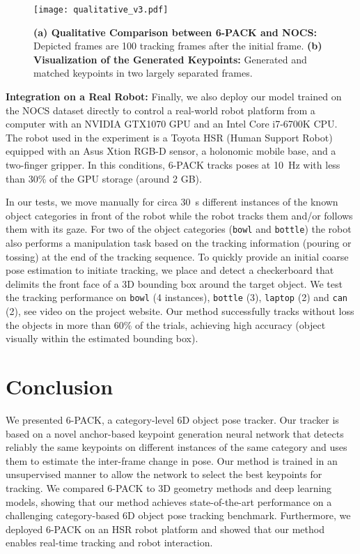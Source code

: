 \documentclass[letterpaper, 10 pt, conference]{ieeeconf}
\newcommand{\methodname}{\textsc{6-PACK}\xspace}
\begin{document}
\begin{figure}[tb]
\center
\texttt{[image: qualitative\_v3.pdf]}
\vspace{-3mm}
\caption{\textbf{(a) Qualitative Comparison between \methodname{} and NOCS:}  Depicted frames are 100 tracking frames after the initial frame. \textbf{(b) 
Visualization of the Generated Keypoints:} Generated and matched keypoints in two largely separated frames.}
\label{fig:qualitative}
\vspace{-4mm}
\end{figure}


\textbf{Integration on a Real Robot:}
Finally, we also deploy our model trained on the NOCS dataset directly to control a real-world robot platform from a computer with an NVIDIA GTX1070 GPU and an Intel Core i7-6700K CPU. The robot used in the experiment is a Toyota HSR (Human Support Robot) equipped with an Asus Xtion RGB-D sensor, a holonomic mobile base, and a two-finger gripper. In this conditions, \methodname{} tracks poses at \SI{10}{\hertz} with less than 30\% of the GPU storage (around 2 GB).


In our tests, we move manually for circa \SI{30}{\second} different instances of the known object categories in front of the robot while the robot tracks them and/or follows them with its gaze. For two of the object categories (\texttt{bowl} and \texttt{bottle}) the robot also performs a manipulation task based on the tracking information (pouring or tossing) at the end of the tracking sequence. To quickly provide an initial coarse pose estimation to initiate tracking, we place and detect a checkerboard that delimits the front face of a 3D bounding box around the target object. We test the tracking performance on \texttt{bowl} (4 instances), \texttt{bottle} (3), \texttt{laptop} (2) and \texttt{can} (2), see video on the project website. Our method successfully tracks without loss the objects in more than 60\% of the trials, achieving high accuracy (object visually within the estimated bounding box). 

\section{Conclusion}
We presented \methodname{}, a category-level 6D object pose tracker. Our tracker is based on a novel anchor-based keypoint generation neural network that detects reliably the same keypoints on different instances of the same category and uses them to estimate the inter-frame change in pose. Our method is trained in an unsupervised manner to allow the network to select the best keypoints for tracking. We compared \methodname{} to 3D geometry methods and deep learning models, showing that our method achieves state-of-the-art performance on a challenging category-based 6D object pose tracking benchmark. Furthermore, we deployed \methodname{} on an HSR robot platform and showed that our method enables real-time tracking and robot interaction.
\end{document}
